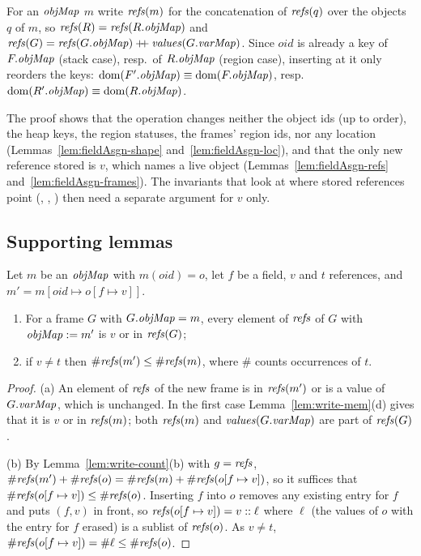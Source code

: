 For an $\mathit{objMap}$ $m$ write $\mathit{refs}(m)$ for the concatenation of $\mathit{refs}(q)$ over the objects $q$ of $m$, so
$\mathit{refs}(R) = \mathit{refs}(R.\mathit{objMap})$ and $\mathit{refs}(G) = \mathit{refs}(G.\mathit{objMap}) \mathbin{+\!\!+} \mathit{values}(G.\mathit{varMap})$. Since $oid$
is already a key of $F.\mathit{objMap}$ (stack case), resp.\ of $R.\mathit{objMap}$ (region case), inserting at it only
reorders the keys: $\mathrm{dom}(F'.\mathit{objMap}) \equiv \mathrm{dom}(F.\mathit{objMap})$, resp.\ $\mathrm{dom}(R'.\mathit{objMap}) \equiv \mathrm{dom}(R.\mathit{objMap})$.

The proof shows that the operation changes neither the object ids (up to order), the heap keys, the
region statuses, the frames' region ids, nor any location
(Lemmas~\ref{lem:fieldAsgn-shape} and~\ref{lem:fieldAsgn-loc}), and that the only new reference
stored is $v$, which names a live object (Lemmas~\ref{lem:fieldAsgn-refs}
and~\ref{lem:fieldAsgn-frames}). The invariants that look at where stored references point
(, , ) then need a separate argument for $v$ only.

\subsection{Supporting lemmas}

\begin{lemma}
\label{lem:fieldAsgn-write}
Let $m$ be an $\mathit{objMap}$ with $m(oid) = o$, let $f$ be a field, $v$ and $t$ references, and
$m' = m[oid \mapsto o[f \mapsto v]]$.
\begin{enumerate}[nosep,label=(\alph*)]
  \item For a frame $G$ with $G.\mathit{objMap} = m$, every element of $\mathit{refs}$ of $G$ with $\mathit{objMap} := m'$ is $v$
    or in $\mathit{refs}(G)$; 
  \item if $v \ne t$ then $\#\mathit{refs}(m') \le \#\mathit{refs}(m)$, where $\#$ counts occurrences of $t$.
\end{enumerate}
\end{lemma}
\begin{proof}
(a) An element of $\mathit{refs}$ of the new frame is in $\mathit{refs}(m')$ or is a value of $G.\mathit{varMap}$, which is
unchanged. In the first case Lemma~\ref{lem:write-mem}(d) gives that it is $v$ or in $\mathit{refs}(m)$; both
$\mathit{refs}(m)$ and $\mathit{values}(G.\mathit{varMap})$ are part of $\mathit{refs}(G)$.

(b) By Lemma~\ref{lem:write-count}(b) with $g = \mathit{refs}$,
$\#\mathit{refs}(m') + \#\mathit{refs}(o) = \#\mathit{refs}(m) + \#\mathit{refs}(o[f \mapsto v])$, so it suffices that
$\#\mathit{refs}(o[f \mapsto v]) \le \#\mathit{refs}(o)$. Inserting $f$ into $o$ removes any existing entry for $f$ and
puts $(f, v)$ in front, so $\mathit{refs}(o[f \mapsto v]) = v :: \ell$ where $\ell$ (the values of $o$ with the
entry for $f$ erased) is a sublist of $\mathit{refs}(o)$. As $v \ne t$,
$\#\mathit{refs}(o[f \mapsto v]) = \#\ell \le \#\mathit{refs}(o)$.
\end{proof}

